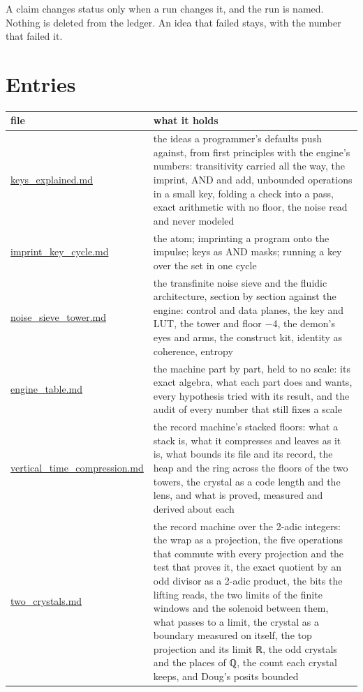 A claim changes status only when a run changes it, and the run is named. Nothing is deleted from the ledger. An idea that failed stays, with the number that failed it.

\section{\texorpdfstring{Entries}{Entries}}

{\small
\setlength{\tabcolsep}{6pt}
\begin{longtable}{>{\RaggedRight\arraybackslash}p{}>{\RaggedRight\arraybackslash}p{}}
\toprule
file & what it holds \\
\midrule
\endhead
\hyperref[chap:keys-explained]{keys\_\allowbreak{}explained.md} & the ideas a programmer's defaults push against, from first principles with the engine's numbers: transitivity carried all the way, the imprint, AND and add, unbounded operations in a small key, folding a check into a pass, exact arithmetic with no floor, the noise read and never modeled \\
\hyperref[chap:imprint-key-cycle]{imprint\_\allowbreak{}key\_\allowbreak{}cycle.md} & the atom; imprinting a program onto the impulse; keys as AND masks; running a key over the set in one cycle \\
\hyperref[chap:noise-sieve-tower]{noise\_\allowbreak{}sieve\_\allowbreak{}tower.md} & the transfinite noise sieve and the fluidic architecture, section by section against the engine: control and data planes, the key and LUT, the tower and floor −4, the demon's eyes and arms, the construct kit, identity as coherence, entropy \\
\hyperref[chap:engine-table]{engine\_\allowbreak{}table.md} & the machine part by part, held to no scale: its exact algebra, what each part does and wants, every hypothesis tried with its result, and the audit of every number that still fixes a scale \\
\hyperref[chap:vertical-time-compression]{vertical\_\allowbreak{}time\_\allowbreak{}compression.md} & the record machine's stacked floors: what a stack is, what it compresses and leaves as it is, what bounds its file and its record, the heap and the ring across the floors of the two towers, the crystal as a code length and the lens, and what is proved, measured and derived about each \\
\hyperref[chap:two-crystals]{two\_\allowbreak{}crystals.md} & the record machine over the 2-adic integers: the wrap as a projection, the five operations that commute with every projection and the test that proves it, the exact quotient by an odd divisor as a 2-adic product, the bits the lifting reads, the two limits of the finite windows and the solenoid between them, what passes to a limit, the crystal as a boundary measured on itself, the top projection and its limit ℝ, the odd crystals and the places of ℚ, the count each crystal keeps, and Doug's posits bounded \\

\end{longtable}}
